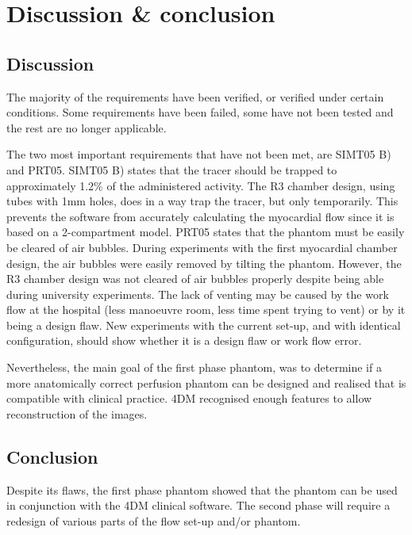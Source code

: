 \chapter{Discussion \& conclusion}
\section{Discussion}
The majority of the requirements have been verified, or verified under certain conditions. Some requirements have been failed, some have not been tested and the rest are no longer applicable.

The two most important requirements that have not been met, are SIMT05 B) and PRT05. SIMT05 B) states that the tracer should be trapped to approximately 1.2\% of the administered activity. The R3 chamber design, using tubes with 1mm holes, does in a way trap the tracer, but only temporarily. This prevents the software from accurately calculating the myocardial flow since it is based on a 2-compartment model. PRT05 states that the phantom must be easily be cleared of air bubbles. During experiments with the first myocardial chamber design, the air bubbles were easily removed by tilting the phantom. However, the R3 chamber design was not cleared of air bubbles properly despite being able during university experiments. The lack of venting may be caused by the work flow at the hospital (less manoeuvre room, less time spent trying to vent) or by it being a design flaw. New experiments with the current set-up, and with identical configuration, should show whether it is a design flaw or work flow error.

Nevertheless, the main goal of the first phase phantom, was to determine if a more anatomically correct perfusion phantom can be designed and realised that is compatible with clinical practice. 4DM recognised enough features to allow reconstruction of the images.

\section{Conclusion}
Despite its flaws, the first phase phantom showed that the phantom can be used in conjunction with the 4DM clinical software. The second phase will require a redesign of various parts of the flow set-up and/or phantom.